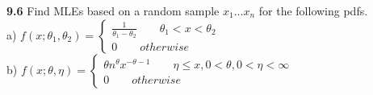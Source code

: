 {\bf 9.6} Find MLEs based on a random sample $x_{1}...x_{n}$ for the following pdfs. \\

\noindent a) $f(x;\theta_{1},\theta_{2} )=\begin{cases} \frac{1}{\theta_{1}-\theta_{2}}\qquad \theta_{1}<x<\theta_{2} \\ 0\qquad otherwise \end{cases}$\\



\noindent b) $f(x;\theta, \eta )=\begin{cases} \theta n^{\theta}x^{-\theta-1}\qquad \eta \le x, 0<\theta, 0<\eta<\infty \\ 0\qquad otherwise \end{cases}$\\ 

